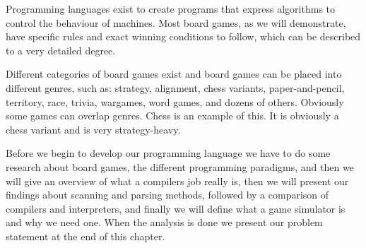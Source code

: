 Programming languages exist to create programs that 
express algorithms to control the behaviour of machines.
Most board games, as we will demonstrate, have specific 
rules and exact winning conditions to follow, which can
be described to a very detailed degree.

Different categories of board games exist and board games 
can be placed into different genres, such as: strategy, 
alignment, chess variants, paper-and-pencil, territory, 
race, trivia, wargames, word games, and dozens of others. 
Obviously some games can overlap genres. Chess is an 
example of this. It is obviously a chess variant and is 
very strategy-heavy.

Before we begin to develop our programming language
we have to do some research about board games, the different 
programming paradigms, and then we will give an overview 
of what a compilers job really is, then we will present our 
findings about scanning and parsing methods, followed by 
a comparison of compilers and interpreters, and finally
we will define what a game simulator is and why we need one.
When the analysis is done we present our problem statement at
the end of this chapter.